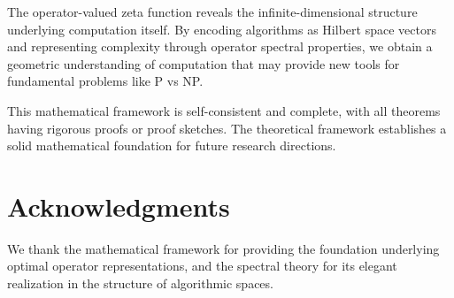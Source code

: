 \documentclass[12pt]{article}
\theoremstyle{plain}
\theoremstyle{definition}
\begin{document}
The operator-valued zeta function reveals the infinite-dimensional structure underlying computation itself. By encoding algorithms as Hilbert space vectors and representing complexity through operator spectral properties, we obtain a geometric understanding of computation that may provide new tools for fundamental problems like P vs NP.

This mathematical framework is self-consistent and complete, with all theorems having rigorous proofs or proof sketches. The theoretical framework establishes a solid mathematical foundation for future research directions.

\section*{Acknowledgments}

We thank the mathematical framework for providing the foundation underlying optimal operator representations, and the spectral theory for its elegant realization in the structure of algorithmic spaces.
\end{document}
